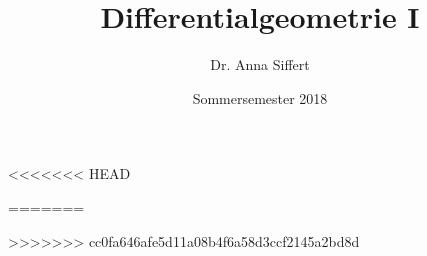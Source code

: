 
\title{Differentialgeometrie I}
\author{Dr. Anna Siffert}
\date{Sommersemester 2018}


\usepackage{amsmath}
\usepackage{amssymb}
\usepackage{dsfont}
\usepackage[amsmath,thmmarks,hyperref]{ntheorem}
\usepackage{mathtools}
\usepackage{dsfont}
\usepackage[arrow, matrix, curve]{xy}
\usepackage{nicefrac}
\usepackage{ wasysym}
\usepackage{upgreek}					%

\usepackage{fontspec} 
\setmainfont{Palatino}
\setsansfont{Optima}
\setmonofont[Scale=MatchLowercase]{Menlo}

\usepackage{polyglossia}
\setmainlanguage{german}
\usepackage{microtype}

\usepackage{geometry}
\usepackage[dvipsnames]{xcolor}
\usepackage{graphicx}
\usepackage{float}
\usepackage{fancyhdr}
\usepackage{csquotes}
\usepackage{blindtext}
\usepackage{todonotes}
\usepackage{booktabs}
\usepackage{array}
\usepackage[labelfont=bf]{caption}
\usepackage{wrapfig}
\usepackage{physics}
<<<<<<< HEAD
\usepackage{titlesec}
=======
\usepackage{enumitem}
\usepackage{xr} %
>>>>>>> cc0fa646afe5d11a08b4f6a58d3ccf2145a2bd8d

\geometry{
	width=150mm,
	bindingoffset=7mm,}



\def\blankpage{%
	\clearpage%
	\thispagestyle{empty}
	\addtocounter{page}{-1}
	\null%
	\clearpage}


\pagestyle{fancy}
\fancyhf{}
\fancyhead[LE]{\footnotesize\nouppercase{\color{mygray}\leftmark}}
\fancyhead[RO]{\footnotesize\nouppercase{\color{mygray}\rightmark}}
	
\renewcommand{\headrulewidth}{0.2pt}
\renewcommand{\footrulewidth}{0pt}

\usepackage{calc}


